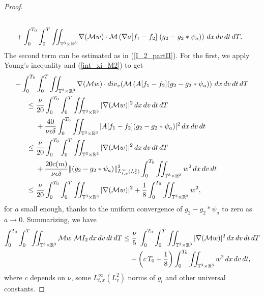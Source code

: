 \documentclass[10pt,a4paper]{amsart}
\newcommand{\Eps}{\epsilon}
\newcommand{\R}{\mathbb R}
\newcommand{\T}{\mathbb{T}}
\newcommand{\dT}{\, {\rm d} T}
\newcommand{\dt}{\, {\rm d} t}
\newcommand{\dv}{\, {\rm d} v}
\newcommand{\dx}{\, {\rm d} x}
\newcommand{\vpran}[1]{\left(#1\right)}
\begin{document}
\begin{proof}
\begin{align*}
\\
& +  \int_0^{T_0} \int_0^{T} \iint_{\T^3 \times \R^3}  \nabla(\mathcal{M} w) \cdot   \mathcal{M} \vpran{ \nabla a[f_1-f_2] \; ( g_2 -g_2 \ast \psi_a)}  \dx\dv\dt\dT. 
\end{align*}
The second term can be estimated as in (\ref{I_2_partII}). For the first, we apply Young's inequality and (\ref{int_xi_M2}) to get 
\begin{align*}
    - \int_0^{T_0}& \int_0^{T} \iint_{\T^3 \times \R^3}  \nabla(\mathcal{M} w) \cdot  \textrm{div}_v ( \mathcal{M} \left( A[f_1-f_2] ( g_2 -g_2 \ast \psi_a) \right) \dx\dv\dt\dT 
\\
    \le  \; & \frac{\nu}{20}\int_0^{T_0} \int_0^{T} \iint_{\T^3 \times \R^3}  |\nabla(\mathcal{M} w)|^2 \dx\dv\dt\dT  
\\
   &  + \frac{40}{\nu \Eps \delta } \int_0^{T_0} \iint_{\T^3 \times \R^3} | A[f_1-f_2] ( g_2 -g_2 \ast \psi_a)|^2 \dx\dv\dt 
\\
 \le  \; & \frac{\nu}{20}\int_0^{T_0} \int_0^{T} \iint_{\T^3 \times \R^3}  |\nabla(\mathcal{M} w)|^2 \dx\dv\dt\dT  
\\
   &  +  \frac{20 c(m)}{\nu \Eps \delta} \|  (g_2 -g_2 \ast \psi_a)\|^2_{L^\infty_{t,x}(L^2_v)} \int_0^{T_0} \iint_{\T^3 \times \R^3} w^2 \dx\dv\dt    
\\
    \le  \; & \frac{\nu}{20}\int_0^{T_0} \int_0^{T} \iint_{\T^3 \times \R^3}  |\nabla(\mathcal{M} w)|^2 %
+  \frac{1}{8 } \int_0^{T_0} \iint_{\T^3 \times \R^3} w^2, %
\end{align*}
for $a$ small enough, thanks to the uniform convergence of $g_2 -g_2 \ast \psi_a$ to zero as $a \to 0$.
Summarizing, we have 
\begin{align*}
    \int_0^{T_0}\int_0^{T} \iint_{\T^3 \times \R^3} \mathcal{M} w \; \mathcal{M}I_2 \dx\dv\dt\dT 
\le & \;  
\frac{ \nu}{5}\; \int_0^{T_0}\int_0^{T} \iint_{\T^3 \times \R^3}  |\nabla(\mathcal{M} w)|^2 \dx\dv\dt\dT 
\\
    &+ \left(c \, T_0+ \frac{1}{8}\right) \int_0^{T_0} \iint_{\T^3 \times \R^3}   w^2  \dx\dv\dt,
\end{align*}
where $c$ depends on $\nu$, some $L^\infty_{t,x}(L^2_v)$ norms of $g_i$ and other universal constants. 



\end{proof}
\end{document}

